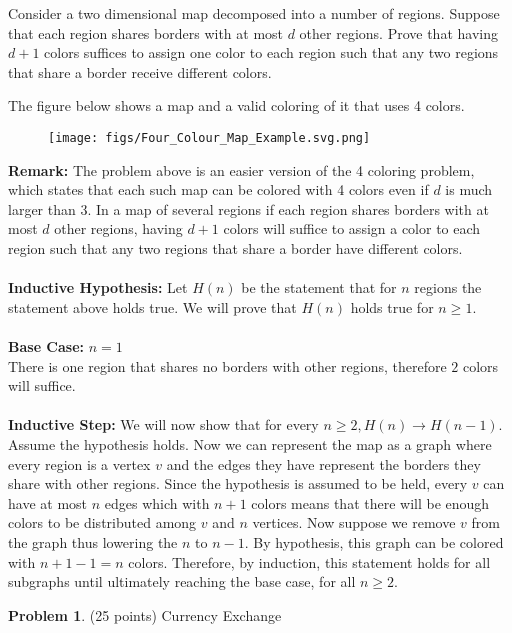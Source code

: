 \documentclass[11pt]{article}
\theoremstyle{definition}
\theoremstyle{theorem}
\newtheorem{prob}{Problem}
\begin{document}
Consider a two dimensional map decomposed into a number of regions. Suppose that each region shares borders with at most $d$ other regions. Prove that having $d+1$ colors suffices to assign one color to each region such that any two regions that share a border receive different colors. 

The figure below shows a map and a valid coloring of it that uses 4 colors.

\begin{figure}[h]
\centering
    \texttt{[image: figs/Four\_Colour\_Map\_Example.svg.png]}
\end{figure}

\textbf{Remark:} The problem above is an easier version of the 4 coloring problem, which states that each such map can be colored with 4 colors even if $d$ is much larger than 3. 
\newpage
In a map of several regions if each region shares borders with at most $d$ other regions, having $d + 1$ colors will suffice to assign a color to each region such that any two regions that share a border have different colors. \\\\
\textbf{Inductive Hypothesis:} Let $H(n)$ be the statement that for $n$ regions the statement above holds true. We will prove that $H(n)$ holds true for $n \ge 1$. \\\\
\textbf{Base Case:} $n = 1$ \\
There is one region that shares no borders with other regions, therefore $2$ colors will suffice. \\\\
\textbf{Inductive Step:} We will now show that for every $n \ge 2, H(n) \rightarrow H(n - 1)$. Assume the hypothesis holds. Now we can represent the map as a graph where every region is a vertex $v$ and the edges they have represent the borders they share with other regions. Since the hypothesis is assumed to be held, every $v$ can have at most $n$ edges which with $n + 1$ colors means that there will be enough colors to be distributed among $v$ and $n$ vertices. Now suppose we remove $v$ from the graph thus lowering the $n$ to $n - 1$. By hypothesis, this graph can be colored with $n + 1 - 1 = n$ colors. Therefore, by induction, this statement holds for all subgraphs until ultimately reaching the base case, for all $n \ge 2$.


\newpage

\begin{prob}
    (25 points) Currency Exchange
\end{prob}
\end{document}
